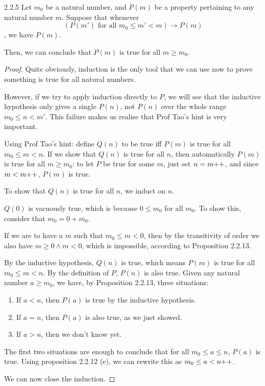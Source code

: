 \begin{exercise}{2.2.5}
Let $m_0$ be a natural number, and $P(m)$ be a property pertaining to any natural number $m$. Suppose that whenever
$$
(P(m') \text{ for all } m_0 \le m' < m) \to P(m)
$$
, we have $P(m)$.

Then, we can conclude that $P(m)$ is true for all $m \ge m_0$.
\end{exercise}
\begin{proof}
Quite obviously, induction is the only tool that we can use now to prove something is true for all natural numbers. 

However, if we try to apply induction directly to $P$, we will see that the inductive hypothesis only gives a single $P(n)$, not $P(n)$ over the whole range $m_0 \le n < m'$. This failure makes us realise that Prof Tao's hint is very important.

Using Prof Tao's hint: define $Q(n)$ to be true iff $P(m)$ is true for all $m_0 \le m < n$. If we show that $Q(n)$ is true for all $n$, then automatically $P(m)$ is true for all $m \ge m_0$: to let $P$ be true for some $m$, just set $n=m{+}{+}$, and since $m < m{+}{+}$, $P(m)$ is true.

To show that $Q(n)$ is true for all $n$, we induct on $n$.

$Q(0)$ is vacuously true, which is because $0 \le m_0$ for all $m_0$. To show this, consider that $m_0 = 0 + m_0$.

If we are to have a $m$ such that $m_0 \le m < 0$, then by the transitivity of order we also have $m \ge 0 \wedge m < 0$, which is impossible, according to Proposition 2.2.13.

By the inductive hypothesis, $Q(n)$ is true, which means $P(m)$ is true for all $m_0 \le m < n$. By the definition of $P$, $P(n)$ is also true. Given any natural number $a \ge m_0$, we have, by Proposition 2.2.13, three situations:
\begin{enumerate}
	\item If $a < n$, then $P(a)$ is true by the inductive hypothesis.
	\item If $a = n$, then $P(a)$ is also true, as we just showed.
	\item If $a > n$, then we don't know yet.
\end{enumerate}
The first two situations are enough to conclude that for all $m_0 \le a \le n$, $P(a)$ is true. Using proposition 2.2.12 (e), we can rewrite this as $m_0 \le a < n{+}{+}$. 

We can now close the induction.
\end{proof}

